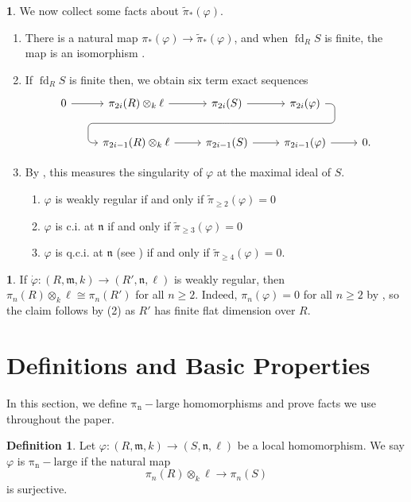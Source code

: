 \documentclass{amsart}
\theoremstyle{definition}
\newtheorem{definition}[theorem]{Definition}
\newtheorem{chunk}[theorem]{}
\newcommand{\m}{\mathfrak{m}}
\newcommand{\n}{\mathfrak{n}}
\newcommand{\fdim}[2]{\operatorname{fd}_{#1}#2}
\newcommand{\wpi}{\widetilde{\pi}}
\newcommand{\pil}[1]{\operatorname{\pi_{#1}-large}}
\begin{document}
\begin{chunk} \label{c_pi-facts}
    We now collect some facts about $\wpi_*(\varphi)$.
    \begin{enumerate}
        \item There is a natural map $\pi_*(\varphi) \to \wpi_*(\varphi)$, and when $\fdim{R}{S}$ is finite, the map is an isomorphism \cite[Theorem 30]{Briggs:2018}.
        \item If $\fdim{R}{S}$ is finite then, we obtain six term exact sequences \cite[Theorem 25 and (3.2)]{Briggs:2018}
        \[
        \begin{tikzcd}
            0 \ar[r] & \pi_{2i}(R)\otimes_k \ell \ar[r] & \pi_{2i}(S) \ar[r] \ar[d, phantom, ""{coordinate, name=Z}] & \pi_{2i}(\varphi) \ar[dll, rounded corners, to path={--([xshift=2ex]\tikztostart.east) |-(Z) \tikztonodes-|([xshift=-2ex]\tikztotarget.west)--(\tikztotarget)}] \\
            & \pi_{2i-1}(R) \otimes_k \ell \ar[r] & \pi_{2i-1}(S) \ar[r] & \pi_{2i-1}(\varphi) \ar[r] & 0.
        \end{tikzcd}
        \]
        \item By \cite[Theorem 32]{Briggs:2018}, this measures the singularity of $\varphi$ at the maximal ideal of $S$.
        \begin{enumerate}
            \item $\varphi$ is weakly regular if and only if $\wpi_{\geq2}(\varphi)=0$
            \item $\varphi$ is c.i. at $\n$ if and only if $\wpi_{\geq3}(\varphi)=0$
            \item $\varphi$ is q.c.i. at $\n$ (see ) if and only if $\wpi_{\geq4}(\varphi)=0$.
        \end{enumerate}
    \end{enumerate}
\end{chunk}


\begin{chunk} \label{C_PiWeaklyRegular}
    If $\dot\varphi \colon (R, \m ,k) \to (R', \n, \ell)$ is weakly regular, then $\pi_n(R) \otimes_k \ell \cong \pi_n(R')$ for all $n \geq 2$. Indeed, $\pi_n(\varphi)=0$ for all $n \geq 2$ by \cite[Proposition 2.6]{Avramov/Iyengar:2003}, so the claim follows by (2) as $R'$ has finite flat dimension over $R$.
\end{chunk}

\section{Definitions and Basic Properties} \label{Section:DefinitionsAndBasicProperties}
In this section, we define $\pil{n}$ homomorphisms and prove facts we use throughout the paper.
\begin{definition} Let $\varphi\colon (R,\m,k)\rightarrow (S,\n,\ell)$ be a local homomorphism. We say $\varphi$ is $\pil{n}$ if the natural map
\[\pi_{n}(R)\otimes_{k}\ell\rightarrow \pi_{n}(S)\]
is surjective.
\end{definition}
\end{document}
